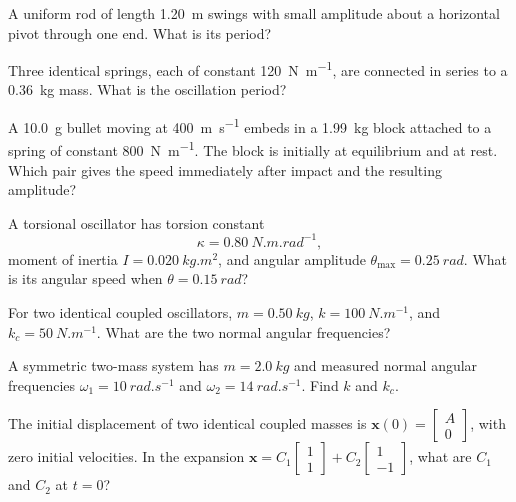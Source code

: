 \documentclass[10pt,a4paper]{physicsquiz}
\begin{document}
\begin{quizquestions}[2]
  \item A uniform rod of length \SI{1.20}{m} swings with small amplitude about a horizontal pivot through one end. What is its period?
  \item Three identical springs, each of constant \SI{120}{N.m^{-1}}, are connected in series to a \SI{0.36}{kg} mass. What is the oscillation period?
  \item A \SI{10.0}{g} bullet moving at \SI{400}{m.s^{-1}} embeds in a \SI{1.99}{kg} block attached to a spring of constant \SI{800}{N.m^{-1}}. The block is initially at equilibrium and at rest. Which pair gives the speed immediately after impact and the resulting amplitude?
  \item A torsional oscillator has torsion constant \[\kappa=\SI{0.80}{N.m.rad^{-1}},\] moment of inertia \(I=\SI{0.020}{kg.m^2}\), and angular amplitude \(\theta_{\max}=\SI{0.25}{rad}\). What is its angular speed when \(\theta=\SI{0.15}{rad}\)?
  \item For two identical coupled oscillators, \(m=\SI{0.50}{kg}\), \(k=\SI{100}{N.m^{-1}}\), and \(k_c=\SI{50}{N.m^{-1}}\). What are the two normal angular frequencies?
  \item A symmetric two-mass system has \(m=\SI{2.0}{kg}\) and measured normal angular frequencies \(\omega_1=\SI{10}{rad.s^{-1}}\) and \(\omega_2=\SI{14}{rad.s^{-1}}\). Find \(k\) and \(k_c\).
  \item The initial displacement of two identical coupled masses is \(\mathbf{x}(0)=\begin{bmatrix}A\\0\end{bmatrix}\), with zero initial velocities. In the expansion \(\mathbf{x}=C_1\begin{bmatrix}1\\1\end{bmatrix}+C_2\begin{bmatrix}1\\-1\end{bmatrix}\), what are \(C_1\) and \(C_2\) at \(t=0\)?

\end{quizquestions}
\end{document}
